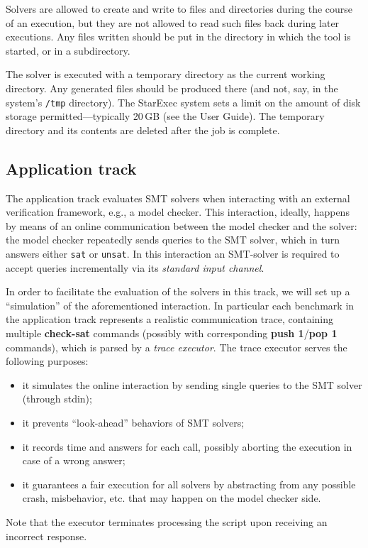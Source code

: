 \documentclass[12pt]{article}
\newcommand{\akey}[1]{\textbf{#1}}
\begin{document}
%
Solvers are allowed to create and write to files and directories
during the course of an execution, but they are not allowed to read
such files back during later executions.  Any files written should be
put in the directory in which the tool is started, or in a
subdirectory.

The solver is executed with a temporary directory as the current
working directory.  Any generated files should be produced there (and
not, say, in the system's {\tt /tmp} directory).  The StarExec system
sets a limit on the amount of disk storage permitted---typically
20\,GB (see the User Guide).  The temporary directory and its contents
are deleted after the job is complete.

\subsection{Application track}
\label{sec:exec:application}

The application track evaluates SMT solvers when interacting with an
external verification framework, e.g., a model checker. This
interaction, ideally, happens by means of an online communication
between the model checker and the solver: the model checker repeatedly
sends queries to the SMT solver, which in turn answers either
\texttt{sat} or \texttt{unsat}.  In this interaction an SMT-solver is
required to accept queries incrementally via its {\em standard input
  channel}.

In order to facilitate the evaluation of the solvers in this track, we
will set up a ``simulation'' of the aforementioned interaction. In
particular each benchmark in the application track represents a
realistic communication trace, containing multiple \akey{check-sat}
commands (possibly with corresponding \akey{push 1}/\akey{pop 1}
commands), which is parsed by a {\em trace executor}. The trace
executor serves the following purposes:
\begin{itemize}
\item it simulates the online interaction by sending single queries to
  the SMT solver (through stdin);
\item it prevents ``look-ahead'' behaviors of SMT solvers;
\item it records time and answers for each call, possibly aborting the
  execution in case of a wrong answer;
\item it guarantees a fair execution for all solvers by abstracting
  from any possible crash, misbehavior, etc. that may happen on the
  model checker side.
\end{itemize}
Note that the executor terminates processing the script upon receiving
an incorrect response.
\end{document}
